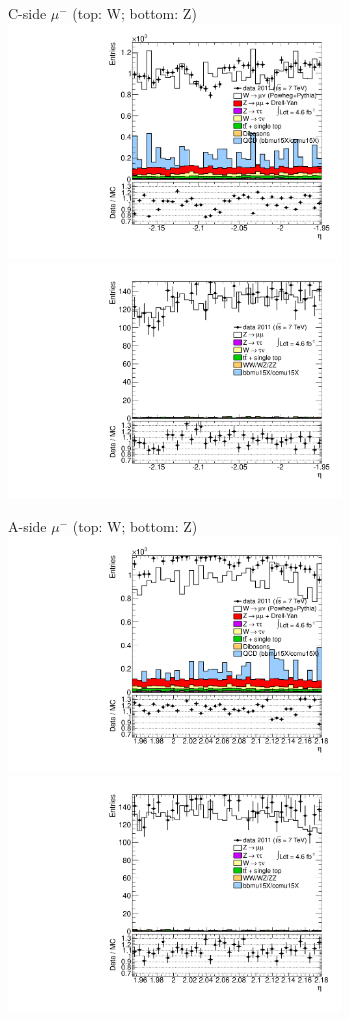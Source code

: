 {{
C-side $\mu^{-}$ (top: W; bottom: Z)
\centering
\includegraphics[width=0.66\textwidth]{dates/20130306/figures/etaphi/Wnjets_10_C_stack_l_eta_NEG} \\
\includegraphics[width=0.66\textwidth]{dates/20130306/figures/etaphi/Znjets_10_C_stack_lN_eta_ALL.pdf}

A-side $\mu^{-}$ (top: W; bottom: Z)
\centering
\includegraphics[width=0.66\textwidth]{dates/20130306/figures/etaphi/Wnjets_10_A_stack_l_eta_NEG} \\
\includegraphics[width=0.66\textwidth]{dates/20130306/figures/etaphi/Znjets_10_A_stack_lN_eta_ALL.pdf} 

}}
